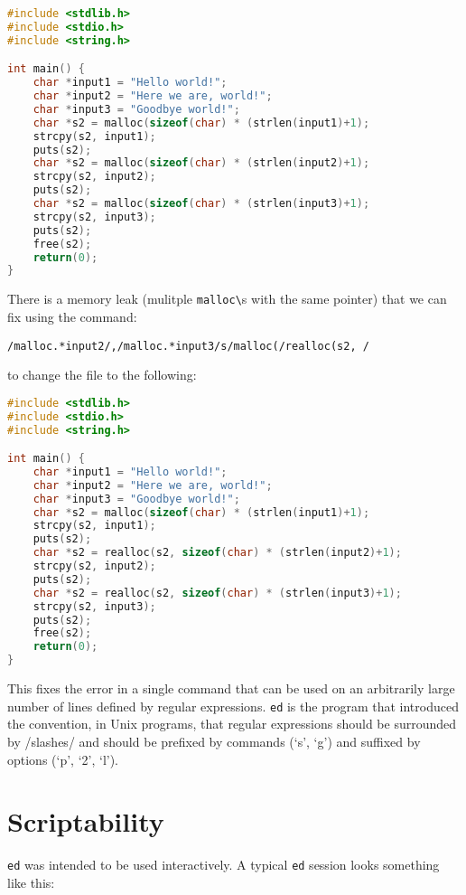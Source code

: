 \documentclass[12pt]{article}
\begin{document}
\begin{lstlisting}[language=c]
#include <stdlib.h>
#include <stdio.h>
#include <string.h>

int main() {
    char *input1 = "Hello world!";
    char *input2 = "Here we are, world!";
    char *input3 = "Goodbye world!";
    char *s2 = malloc(sizeof(char) * (strlen(input1)+1);
    strcpy(s2, input1);
    puts(s2);
    char *s2 = malloc(sizeof(char) * (strlen(input2)+1);
    strcpy(s2, input2);
    puts(s2);
    char *s2 = malloc(sizeof(char) * (strlen(input3)+1);
    strcpy(s2, input3);
    puts(s2);
    free(s2);
    return(0);
}
\end{lstlisting}

There is a memory leak (mulitple \lstinline{malloc\}s with the same pointer) that we
can fix using the command:

\begin{lstlisting}
/malloc.*input2/,/malloc.*input3/s/malloc(/realloc(s2, /

\end{lstlisting}
to change the file to the following:

\begin{lstlisting}[language=c]
#include <stdlib.h>
#include <stdio.h>
#include <string.h>

int main() {
    char *input1 = "Hello world!";
    char *input2 = "Here we are, world!";
    char *input3 = "Goodbye world!";
    char *s2 = malloc(sizeof(char) * (strlen(input1)+1);
    strcpy(s2, input1);
    puts(s2);
    char *s2 = realloc(s2, sizeof(char) * (strlen(input2)+1);
    strcpy(s2, input2);
    puts(s2);
    char *s2 = realloc(s2, sizeof(char) * (strlen(input3)+1);
    strcpy(s2, input3);
    puts(s2);
    free(s2);
    return(0);
}
\end{lstlisting}

This fixes the error in a single command that can be used on an arbitrarily large
number of lines defined by regular expressions.
\lstinline{ed} is the program that introduced the convention,
in Unix programs, that regular expressions should be surrounded
by /slashes/ and should be prefixed by commands (`s', `g') and suffixed
by options (`p', `2', `l').

\section{Scriptability}

\lstinline{ed} was intended to be used interactively. A typical \lstinline{ed}
session looks something like this:
\end{document}
